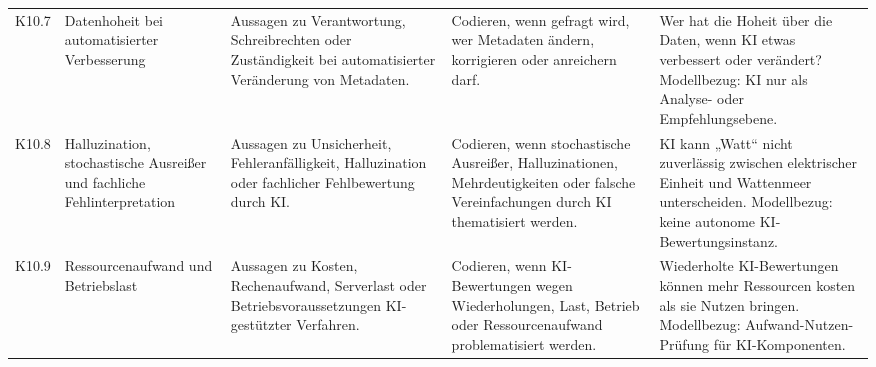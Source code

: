 \begin{longtable}{p{1cm} p{2.5cm} p{3.2cm} p{4.5cm} p{4.5cm}}
K10.7 & Datenhoheit bei automatisierter Verbesserung
& Aussagen zu Verantwortung, Schreibrechten oder Zuständigkeit bei automatisierter Veränderung von Metadaten.
& Codieren, wenn gefragt wird, wer Metadaten ändern, korrigieren oder anreichern darf.
& Wer hat die Hoheit über die Daten, wenn KI etwas verbessert oder verändert? Modellbezug: KI nur als Analyse- oder Empfehlungsebene. \\

K10.8 & Halluzination, stochastische Ausreißer und fachliche Fehlinterpretation
& Aussagen zu Unsicherheit, Fehleranfälligkeit, Halluzination oder fachlicher Fehlbewertung durch KI.
& Codieren, wenn stochastische Ausreißer, Halluzinationen, Mehrdeutigkeiten oder falsche Vereinfachungen durch KI thematisiert werden.
& KI kann „Watt“ nicht zuverlässig zwischen elektrischer Einheit und Wattenmeer unterscheiden. Modellbezug: keine autonome KI-Bewertungsinstanz. \\

K10.9 & Ressourcenaufwand und Betriebslast
& Aussagen zu Kosten, Rechenaufwand, Serverlast oder Betriebsvoraussetzungen KI-gestützter Verfahren.
& Codieren, wenn KI-Bewertungen wegen Wiederholungen, Last, Betrieb oder Ressourcenaufwand problematisiert werden.
& Wiederholte KI-Bewertungen können mehr Ressourcen kosten als sie Nutzen bringen. Modellbezug: Aufwand-Nutzen-Prüfung für KI-Komponenten. \\

\end{longtable}

\endgroup
